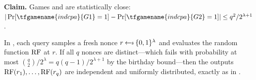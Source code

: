 \textbf{Claim.}
  Games  and  are statistically close:
  $|\Pr[\tfgamename{indcpa}{G1} = 1] - \Pr[\tfgamename{indcpa}{G2} = 1]| \leq q^2 / 2^{\lambda+1}$.

In , each query samples a fresh nonce $r \getsr \{0,1\}^\lambda$
and evaluates the random function $\mathrm{RF}$ at $r$.  If all $q$ nonces are distinct---which
fails with probability at most $\binom{q}{2}/2^\lambda = q(q-1)/2^{\lambda+1}$
by the birthday bound---then the outputs $\mathrm{RF}(r_1), \ldots, \mathrm{RF}(r_q)$
are independent and uniformly distributed, exactly as in .
